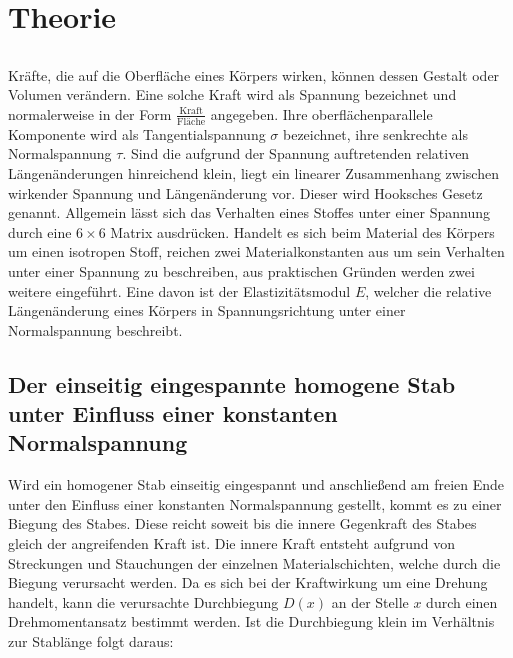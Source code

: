 
\section{Theorie}
\label{sec:Theorie}

\subsection{}
Kräfte, die auf die Oberfläche eines Körpers wirken, können dessen Gestalt oder
 Volumen verändern. Eine solche Kraft wird als Spannung bezeichnet und normalerweise
  in der Form $\frac{\text{Kraft}}{\text{Fläche}}$ angegeben. Ihre oberflächenparallele
   Komponente wird als Tangentialspannung $\sigma$ bezeichnet, ihre senkrechte als Normalspannung $\tau$.
Sind die aufgrund der Spannung auftretenden relativen Längenänderungen hinreichend
 klein, liegt ein linearer Zusammenhang zwischen wirkender Spannung und Längenänderung vor.
      Dieser wird Hooksches Gesetz genannt.
       Allgemein lässt sich das Verhalten eines Stoffes unter einer Spannung durch eine
        $6\times6$ Matrix ausdrücken.
      Handelt es sich beim Material des Körpers um einen isotropen Stoff,
       reichen zwei Materialkonstanten aus um sein Verhalten unter einer Spannung
        zu beschreiben, aus praktischen Gründen werden zwei weitere eingeführt.
         Eine davon ist der Elastizitätsmodul $E$, welcher die
         relative Längenänderung eines Körpers in Spannungsrichtung unter
          einer Normalspannung beschreibt.

\subsection{Der einseitig eingespannte homogene Stab unter Einfluss einer konstanten Normalspannung}
Wird ein homogener Stab einseitig eingespannt und anschließend am freien Ende unter den Einfluss
 einer konstanten Normalspannung gestellt, kommt es zu einer Biegung des Stabes. Diese
  reicht soweit bis die innere Gegenkraft des Stabes gleich der angreifenden Kraft ist. Die
   innere Kraft entsteht aufgrund von Streckungen und Stauchungen der einzelnen
    Materialschichten, welche durch die Biegung verursacht werden. Da es sich bei
     der Kraftwirkung um eine Drehung handelt, kann die verursachte Durchbiegung
      $D(x)$ an der Stelle $x$ durch einen Drehmomentansatz bestimmt werden.
       Ist die Durchbiegung klein im Verhältnis zur Stablänge folgt daraus:


